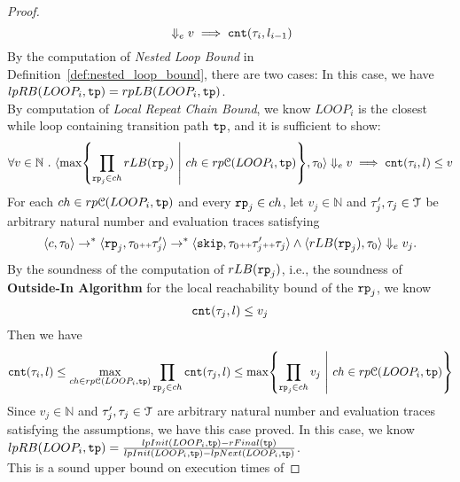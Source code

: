 \begin{proof}
\[{          } \Downarrow_e v 
          \implies  
          \mathtt{cnt}(\mathtt{\tau}_i, l_{{i-1}})
        \]   
        By the computation of \emph{Nested Loop Bound} in Definition~\ref{def:nested_loop_bound},
        there are two cases:
        In this case, we have $lpRB(LOOP_i, \mathtt{tp}) = rpLB(LOOP_i, \mathtt{tp})$.
        \\
        By computation of \emph{Local Repeat Chain Bound}, we know 
        $LOOP_i$ is the closest while loop containing transition path $\mathtt{tp}$,
        and it is sufficient to show:
        \[
            \forall v \in \mathbb{N} \st
            \config{
        \max \left\{ \prod\limits_{\rprog_j \in ch}  rLB(\rprog_j) 
        ~\middle\vert~ ch \in rp\mathcal{C}(LOOP_i, \tpath) \right\}, \trace_0
          } \earrow v \implies  \vcounter(\vtrace_i, l) \leq v
        \]
    For each $ch \in rp\mathcal{C}(LOOP_i, \mathtt{tp})$ and 
    every $\mathtt{rp}_j \in ch$, let $ v_j \in \mathbb{N}$  and 
            $\mathtt{\tau}_j', \mathtt{\tau}_j \in \mathcal{T}$ be arbitrary natural number
            and evaluation traces satisfying 
            \[
                \langle  c, \mathtt{\tau}_0 \rangle \to^{*} 
                \langle \mathtt{rp}_j, \mathtt{\tau}_0 {\scriptscriptstyle ++} \mathtt{\tau}_j' \rangle \to^*
                \langle \mathtt{skip}, \mathtt{\tau}_0 {\scriptscriptstyle ++} \mathtt{\tau}_j' {\scriptscriptstyle ++} \mathtt{\tau}_j \rangle
                \land
                 \langle rLB(\mathtt{rp}_j),\mathtt{\tau}_0  \rangle \Downarrow_e v_j.
            \]
        By the soundness of the computation of $rLB(\mathtt{rp}_j)$, 
       i.e., the soundness of \textbf{Outside-In Algorithm} for the local reachability
                  bound of the $\mathtt{rp}_j$, we know 
                  \[
                    \mathtt{cnt}(\mathtt{\tau}_j, l) \leq v_j
                    \]
Then we have 
\[
    \vcounter(\vtrace_i, l) 
    \leq \max_{ch \in rp\mathcal{C}(LOOP_i, \tpath)} 
    \prod\limits_{\rprog_j \in ch}
    \vcounter(\vtrace_j, l) \leq 
    \max \left\{ \prod\limits_{\rprog_j \in ch}  v_j 
        ~\middle\vert~ ch \in rp\mathcal{C}(LOOP_i, \tpath) \right\}
    \]
Since $ v_j \in \mathbb{N}$  and 
$\mathtt{\tau}_j', \mathtt{\tau}_j \in \mathcal{T}$ are arbitrary natural number
and evaluation traces satisfying the assumptions, we have this case proved.
%
        In this case, we know 
        $lpRB(LOOP_i, \mathtt{tp}) =
        \frac{lpInit(LOOP_i, \mathtt{tp}) - rFinal(\mathtt{tp})}{lpInit(LOOP_i, \mathtt{tp}) - lpNext(LOOP_i, \mathtt{tp})}$.
        \\
        This is a sound upper bound on execution times of 

\end{proof}
